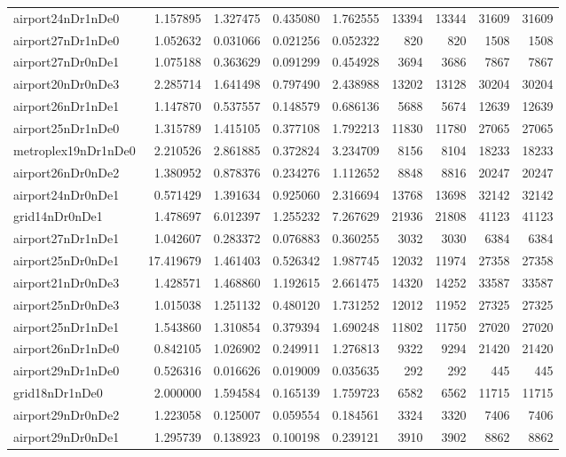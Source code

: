 \begin{longtable}{|l|r|r|r|r|r|r|r|r|}
airport24nDr1nDe0 & 1.157895 & 1.327475 & 0.435080 & 1.762555 & 13394 & 13344 & 31609 & 31609 \\
airport27nDr1nDe0 & 1.052632 & 0.031066 & 0.021256 & 0.052322 & 820 & 820 & 1508 & 1508 \\
airport27nDr0nDe1 & 1.075188 & 0.363629 & 0.091299 & 0.454928 & 3694 & 3686 & 7867 & 7867 \\
airport20nDr0nDe3 & 2.285714 & 1.641498 & 0.797490 & 2.438988 & 13202 & 13128 & 30204 & 30204 \\
airport26nDr1nDe1 & 1.147870 & 0.537557 & 0.148579 & 0.686136 & 5688 & 5674 & 12639 & 12639 \\
airport25nDr1nDe0 & 1.315789 & 1.415105 & 0.377108 & 1.792213 & 11830 & 11780 & 27065 & 27065 \\
metroplex19nDr1nDe0 & 2.210526 & 2.861885 & 0.372824 & 3.234709 & 8156 & 8104 & 18233 & 18233 \\
airport26nDr0nDe2 & 1.380952 & 0.878376 & 0.234276 & 1.112652 & 8848 & 8816 & 20247 & 20247 \\
airport24nDr0nDe1 & 0.571429 & 1.391634 & 0.925060 & 2.316694 & 13768 & 13698 & 32142 & 32142 \\
grid14nDr0nDe1 & 1.478697 & 6.012397 & 1.255232 & 7.267629 & 21936 & 21808 & 41123 & 41123 \\
airport27nDr1nDe1 & 1.042607 & 0.283372 & 0.076883 & 0.360255 & 3032 & 3030 & 6384 & 6384 \\
airport25nDr0nDe1 & 17.419679 & 1.461403 & 0.526342 & 1.987745 & 12032 & 11974 & 27358 & 27358 \\
airport21nDr0nDe3 & 1.428571 & 1.468860 & 1.192615 & 2.661475 & 14320 & 14252 & 33587 & 33587 \\
airport25nDr0nDe3 & 1.015038 & 1.251132 & 0.480120 & 1.731252 & 12012 & 11952 & 27325 & 27325 \\
airport25nDr1nDe1 & 1.543860 & 1.310854 & 0.379394 & 1.690248 & 11802 & 11750 & 27020 & 27020 \\
airport26nDr1nDe0 & 0.842105 & 1.026902 & 0.249911 & 1.276813 & 9322 & 9294 & 21420 & 21420 \\
airport29nDr1nDe0 & 0.526316 & 0.016626 & 0.019009 & 0.035635 & 292 & 292 & 445 & 445 \\
grid18nDr1nDe0 & 2.000000 & 1.594584 & 0.165139 & 1.759723 & 6582 & 6562 & 11715 & 11715 \\
airport29nDr0nDe2 & 1.223058 & 0.125007 & 0.059554 & 0.184561 & 3324 & 3320 & 7406 & 7406 \\
airport29nDr0nDe1 & 1.295739 & 0.138923 & 0.100198 & 0.239121 & 3910 & 3902 & 8862 & 8862 \\

\end{longtable}
